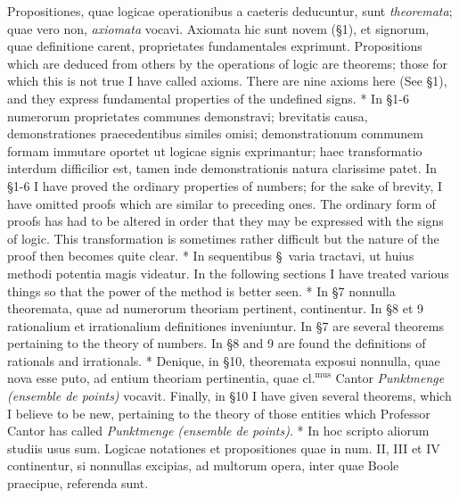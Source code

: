 \documentclass{book}
\newenvironment{translateTwoCol}
               { %
                 \columnratio{0.5, 0.5} \begin{paracol}{2}
                 \newcommand{\LAT}{\switchcolumn[0]*}
                 \newcommand{\ENG}{\switchcolumn[1]}
               }
               { %
                 \let\ENG\undefined
                 \let\LAT\undefined
                 \end{paracol}
               }
\begin{document}
\begin{translateTwoCol}
Propositiones, quae logicae operationibus a caeteris deducuntur, sunt \emph{theoremata}; quae vero non, \emph{axiomata} vocavi. Axiomata hic sunt novem (\S 1), et signorum, quae definitione carent, proprietates fundamentales exprimunt.
\ENG
Propositions which are deduced from others by the operations of logic are theorems; those for which this is not true I have called axioms. There are nine axioms here (See \S 1), and they express fundamental properties of the undefined signs.
\LAT
In \S 1-6 numerorum proprietates communes demonstravi; brevitatis causa, demonstrationes praecedentibus similes omisi; demonstrationum communem formam immutare oportet ut logicae signis exprimantur; haec transformatio interdum difficilior est, tamen inde demonstrationis natura clarissime patet.
\ENG
In \S 1-6 I have proved the ordinary properties of numbers; for the sake of brevity, I have omitted proofs which are similar to preceding ones. The ordinary form of proofs has had to be altered in order that they may be expressed with the signs of logic. This transformation is sometimes rather difficult but the nature of the proof then becomes quite clear. 
\LAT
In sequentibus \S \ varia tractavi, ut huius methodi potentia magis videatur.
\ENG
In the following sections I have treated various things so that the power of the method is better seen.
\LAT
In \S 7 nonnulla theoremata, quae ad numerorum theoriam pertinent, continentur. In \S 8 et 9 rationalium et irrationalium definitiones inveniuntur.
\ENG
In \S 7 are several theorems pertaining to the theory of numbers. In \S 8 and 9 are found the definitions of rationals and irrationals.
\LAT
Denique, in \S 10, theoremata exposui nonnulla, quae nova esse puto, ad entium theoriam pertinentia, quae $\text{cl.}^{\text{mus}}$ Cantor \emph{Punktmenge (ensemble de points)} vocavit.
\ENG
Finally, in \S 10 I have given several theorems, which I believe to be new, pertaining to the theory of those entities which Professor Cantor has called \emph{Punktmenge (ensemble de points)}.
\LAT
In hoc scripto aliorum studiis usus sum. Logicae notationes et propositiones quae in num. II, III et IV continentur, si nonnullas excipias, ad multorum opera, inter quae Boole praecipue, referenda sunt.
\end{translateTwoCol}
\end{document}
